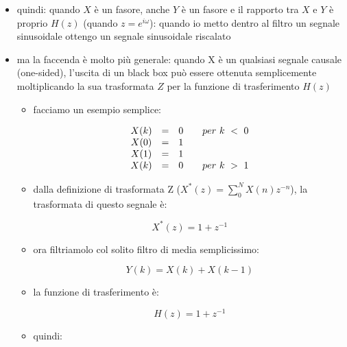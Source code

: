 \begin{itemize}
\item quindi: quando $X$ \`e un fasore, anche $Y$ \`e un fasore e il rapporto tra $X$ e
			$Y$ \`e proprio $H(z)$ (quando $z = e^{i\omega}$): quando io metto dentro al filtro un
      segnale sinusoidale ottengo un segnale sinusoidale riscalato

\item ma la faccenda \`e molto pi\`u generale: quando X  \`e  un  qualsiasi
      segnale causale (one-sided), l'uscita di un black box pu\`o  essere
      ottenuta semplicemente moltiplicando la sua trasformata $Z$  per  la
      funzione di trasferimento $H(z)$
 
			\begin{itemize}

			\item facciamo un esempio semplice:
 
				\begin{equation}
	 			\begin{array}{c c c l}
	  			X(k) & = & 0  & \quad per~k~<~0\\
         X(0) & = & 1  &          \\
         X(1) & = & 1  &          \\
				 X(k) & = & 0  & \quad per~k~>~1\\
					\end{array}
			 \end{equation}
 
 \item dalla definizione di trasformata Z ($X^{*}(z) = \sum_0^{N}{X(n)z^{-n}}$), la trasformata di questo segnale \`e:

				 \begin{equation}
								 X^{*}(z) = 1 + z^{-1}
				 \end{equation}
 
 \item ora filtriamolo col solito filtro di media semplicissimo:
 
		 		\begin{equation}
        	 Y(k) = X(k) + X(k-1)
		    \end{equation}
 
 \item la funzione di trasferimento \`e:
 
		 \begin{equation}
						 H(z) = 1 + z^{-1}
		 \end{equation}
 
 \item quindi:
 

\end{itemize}
\end{itemize}

